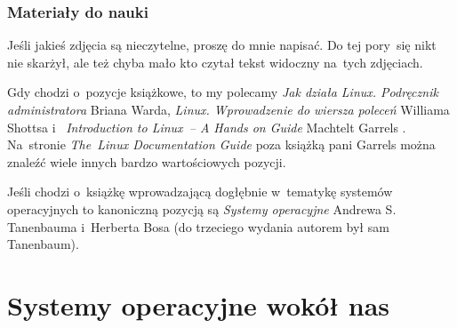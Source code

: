 \documentclass[10pt,t]{beamer}
\begin{document}
\begin{frame}
  \frametitle{Materiały do nauki}


  Jeśli jakieś zdjęcia są nieczytelne, proszę do mnie napisać. Do tej
  pory~się nikt nie skarżył, ale też chyba mało kto czytał tekst widoczny
  na~tych zdjęciach.

  Gdy chodzi o~pozycje książkowe, to my polecamy
  {\textit{Jak działa Linux. Podręcznik administratora}} Briana Warda,
  {\textit{Linux. Wprowadzenie do wiersza poleceń}} Williama Shottsa
  i~
  {\textit{Introduction to Linux~-- A Hands on Guide}} Machtelt Garrels
  \parencite{Garrels-Introduction-to-Linux-A-Hands-on-Guide-Ver-2008}.
  Na~stronie 
  {\textit{The~Linux Documentation Guide}} poza książką pani Garrels można
  znaleźć wiele innych bardzo wartościowych pozycji.

  Jeśli chodzi o~książkę wprowadzającą dogłębnie w~tematykę systemów
  operacyjnych to kanoniczną pozycją są
  {\textit{Systemy operacyjne}} Andrewa S. Tanenbauma i~Herberta Bosa
  (do trzeciego wydania autorem był sam Tanenbaum).

\end{frame}










\section{Systemy operacyjne wokół nas}
\end{document}
